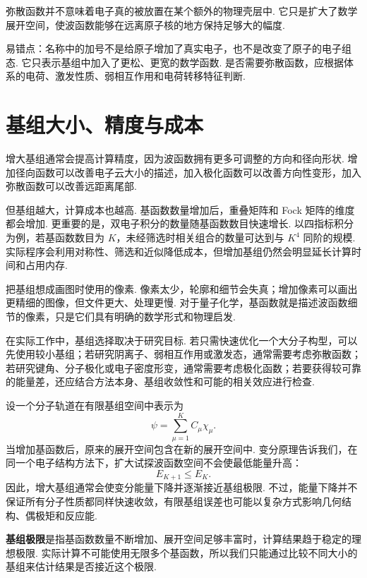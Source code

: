 \documentclass[UTF8,11pt,a4paper,openany]{ctexbook}
\newcommand{\term}[1]{\textbf{#1}}
\begin{document}
弥散函数并不意味着电子真的被放置在某个额外的物理壳层中. 它只是扩大了数学展开空间，使波函数能够在远离原子核的地方保持足够大的幅度. 

\begin{limitbox}
易错点：名称中的加号不是给原子增加了真实电子，也不是改变了原子的电子组态. 它只表示基组中加入了更松、更宽的数学函数. 是否需要弥散函数，应根据体系的电荷、激发性质、弱相互作用和电荷转移特征判断. 
\end{limitbox}

\section{基组大小、精度与成本}

增大基组通常会提高计算精度，因为波函数拥有更多可调整的方向和径向形状. 增加径向函数可以改善电子云大小的描述，加入极化函数可以改善方向性变形，加入弥散函数可以改善远距离尾部. 

但基组越大，计算成本也越高. 基函数数量增加后，重叠矩阵和 Fock 矩阵的维度都会增加. 更重要的是，双电子积分的数量随基函数数目快速增长. 以四指标积分为例，若基函数数目为 $K$，未经筛选时相关组合的数量可达到与 $K^4$ 同阶的规模. 实际程序会利用对称性、筛选和近似降低成本，但增加基组仍然会明显延长计算时间和占用内存. 

\begin{analogybox}
把基组想成画图时使用的像素. 像素太少，轮廓和细节会失真；增加像素可以画出更精细的图像，但文件更大、处理更慢. 对于量子化学，基函数就是描述波函数细节的像素，只是它们具有明确的数学形式和物理启发. 
\end{analogybox}

在实际工作中，基组选择取决于研究目标. 若只需快速优化一个大分子构型，可以先使用较小基组；若研究阴离子、弱相互作用或激发态，通常需要考虑弥散函数；若研究键角、分子极化或电子密度形变，通常需要考虑极化函数；若要获得较可靠的能量差，还应结合方法本身、基组收敛性和可能的相关效应进行检查. 

\begin{derivationbox}
设一个分子轨道在有限基组空间中表示为
\[
\psi=\sum_{\mu=1}^{K}C_\mu\chi_\mu.
\]
当增加基函数后，原来的展开空间包含在新的展开空间中. 变分原理告诉我们，在同一个电子结构方法下，扩大试探波函数空间不会使最低能量升高：
\[
E_{K+1}\leq E_K.
\]
因此，增大基组通常会使变分能量下降并逐渐接近基组极限. 不过，能量下降并不保证所有分子性质都同样快速收敛，有限基组误差也可能以复杂方式影响几何结构、偶极矩和反应能. 
\end{derivationbox}

\begin{definitionbox}
\term{基组极限}是指基函数数量不断增加、展开空间足够丰富时，计算结果趋于稳定的理想极限. 实际计算不可能使用无限多个基函数，所以我们只能通过比较不同大小的基组来估计结果是否接近这个极限. 
\end{definitionbox}
\end{document}
